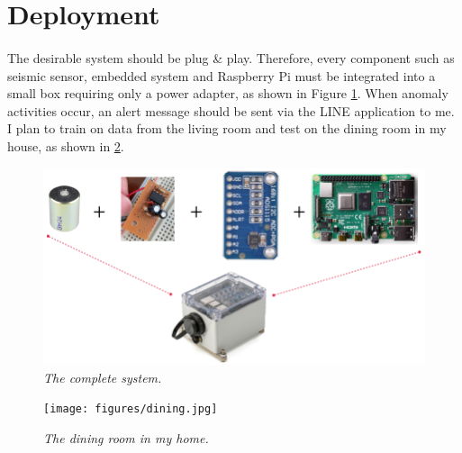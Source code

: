 \section{Deployment}
\paragraph{}
The desirable system should be plug \& play. Therefore, every component such as seismic sensor, embedded system and Raspberry Pi must be integrated into a small box requiring only a power adapter, as shown in Figure \ref{fig:application}. When anomaly activities occur, an alert message should be sent via the LINE application to me. I plan to train on data from the living room and test on the dining room in my house, as shown in \ref{fig:dining}.

\begin{figure}[H]
  \centering
  \caption[The complete application.]{\emph{The complete system.}} \label{fig:application}
  \includegraphics[scale = 0.35]{figures/application.png}  
\end{figure}

\begin{figure}[H]
  \centering
  \caption[The dining room in my home.]{\emph{The dining room in my home.}} \label{fig:dining}
  \texttt{[image: figures/dining.jpg]}  
\end{figure}

\FloatBarrier